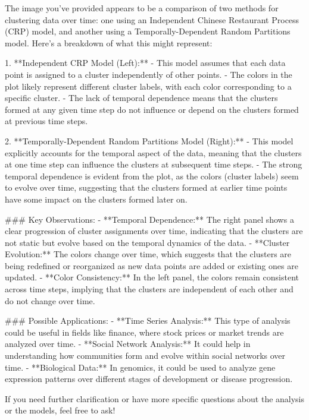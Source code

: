 The image you've provided appears to be a comparison of two methods for clustering data over time: one using an Independent Chinese Restaurant Process (CRP) model, and another using a Temporally-Dependent Random Partitions model. Here's a breakdown of what this might represent:

1. **Independent CRP Model (Left):**
   - This model assumes that each data point is assigned to a cluster independently of other points.
   - The colors in the plot likely represent different cluster labels, with each color corresponding to a specific cluster.
   - The lack of temporal dependence means that the clusters formed at any given time step do not influence or depend on the clusters formed at previous time steps.

2. **Temporally-Dependent Random Partitions Model (Right):**
   - This model explicitly accounts for the temporal aspect of the data, meaning that the clusters at one time step can influence the clusters at subsequent time steps.
   - The strong temporal dependence is evident from the plot, as the colors (cluster labels) seem to evolve over time, suggesting that the clusters formed at earlier time points have some impact on the clusters formed later on.

### Key Observations:
- **Temporal Dependence:** The right panel shows a clear progression of cluster assignments over time, indicating that the clusters are not static but evolve based on the temporal dynamics of the data.
- **Cluster Evolution:** The colors change over time, which suggests that the clusters are being redefined or reorganized as new data points are added or existing ones are updated.
- **Color Consistency:** In the left panel, the colors remain consistent across time steps, implying that the clusters are independent of each other and do not change over time.

### Possible Applications:
- **Time Series Analysis:** This type of analysis could be useful in fields like finance, where stock prices or market trends are analyzed over time.
- **Social Network Analysis:** It could help in understanding how communities form and evolve within social networks over time.
- **Biological Data:** In genomics, it could be used to analyze gene expression patterns over different stages of development or disease progression.

If you need further clarification or have more specific questions about the analysis or the models, feel free to ask!